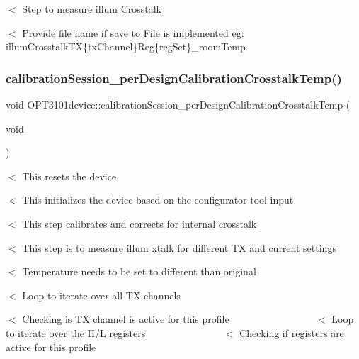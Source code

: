 $<$ Step to measure illum Crosstalk

$<$ Provide file name if save to File is implemented eg\+: illum\+Crosstalk\+TX\{tx\+Channel\}Reg\{reg\+Set\}\+\_\+room\+Temp \mbox{\label{class_o_p_t3101device_a545184fdfeca4a576d613ef190131c05}} 
\subsubsection{\texorpdfstring{calibration\+Session\+\_\+per\+Design\+Calibration\+Crosstalk\+Temp()}{calibrationSession\_perDesignCalibrationCrosstalkTemp()}}
{\footnotesize\ttfamily void O\+P\+T3101device\+::calibration\+Session\+\_\+per\+Design\+Calibration\+Crosstalk\+Temp (\begin{DoxyParamCaption}\item[{void}]{ }\end{DoxyParamCaption})}

$<$ This resets the device

$<$ This initializes the device based on the configurator tool input

$<$ This step calibrates and corrects for internal crosstalk

$<$ This step is to measure illum xtalk for different TX and current settings

$<$ Temperature needs to be set to different than original

$<$ Loop to iterate over all TX channels

$<$ Checking is TX channel is active for this profile ~\newline
~\newline
~\newline
~\newline
~\newline
~\newline
~\newline
~\newline
~\newline
~\newline
 $<$ Loop to iterate over the H/L registers ~\newline
~\newline
~\newline
~\newline
~\newline
~\newline
~\newline
~\newline
~\newline
 $<$ Checking if registers are active for this profile

